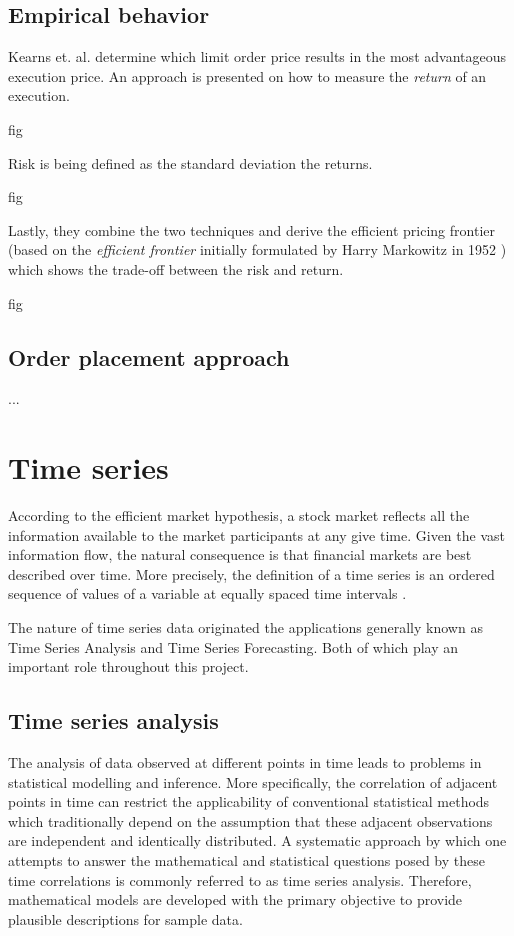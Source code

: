 \subsection{Empirical behavior}

Kearns et. al. \cite{nevmyvaka2005electronic} determine which limit order price results in the most advantageous execution price.
An approach is presented on how to measure the \textit{return} of an execution.

fig 

Risk is being defined as the standard deviation the returns. 

fig

Lastly, they combine the two techniques and derive the efficient pricing frontier (based on the \textit{efficient frontier} initially formulated by Harry Markowitz in 1952 \cite{markowitz1952portfolio}) which shows the trade-off between the risk and return.

fig

\subsection{Order placement approach}

...


\section{Time series}

According to the efficient market hypothesis\cite{malkiel1989efficient}, a stock market reflects all the information available to the market participants at any give time. 
Given the vast information flow, the natural consequence is that financial markets are best described over time. 
More precisely, the definition of a time series is an ordered sequence of values of a variable at equally spaced time intervals \cite{intro-timeseries}.

The nature of time series data originated the applications generally known as Time Series Analysis and Time Series Forecasting. 
Both of which play an important role throughout this project.

\subsection{Time series analysis}

The analysis of data observed at different points in time leads to problems in statistical modelling and inference. 
More specifically, the correlation of adjacent points in time can restrict the applicability of conventional statistical methods which traditionally depend on the assumption that these adjacent observations are independent and identically distributed. 
A systematic approach by which one attempts to answer the mathematical and statistical questions posed by these time correlations is commonly referred to as time series analysis. 
Therefore, mathematical models are developed with the primary objective to provide plausible descriptions for sample data. \cite{shumway2000time}

